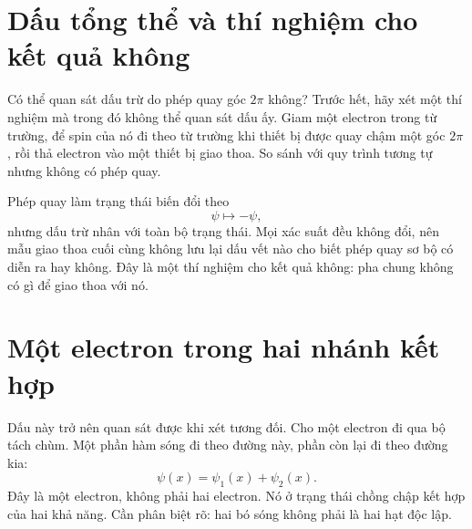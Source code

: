 \begin{classroomqa}
\end{classroomqa}

\section{Dấu tổng thể và thí nghiệm cho kết quả không}

Có thể quan sát dấu trừ do phép quay góc \(2\pi\) không? Trước hết, hãy xét một thí nghiệm mà trong đó không thể quan sát dấu ấy. Giam một electron trong từ trường, để spin của nó đi theo từ trường khi thiết bị được quay chậm một góc \(2\pi\), rồi thả electron vào một thiết bị giao thoa. So sánh với quy trình tương tự nhưng không có phép quay.

Phép quay làm trạng thái biến đổi theo
\begin{equation}
\psi\longmapsto-\psi,
\end{equation}
nhưng dấu trừ nhân với toàn bộ trạng thái. Mọi xác suất đều không đổi, nên mẫu giao thoa cuối cùng không lưu lại dấu vết nào cho biết phép quay sơ bộ có diễn ra hay không. Đây là một thí nghiệm cho kết quả không: pha chung không có gì để giao thoa với nó.

\begin{classroomqa}
\end{classroomqa}

\section{Một electron trong hai nhánh kết hợp}

Dấu này trở nên quan sát được khi xét tương đối. Cho một electron đi qua bộ tách chùm. Một phần hàm sóng đi theo đường này, phần còn lại đi theo đường kia:
\begin{equation}
\psi(x)=\psi_1(x)+\psi_2(x).
\end{equation}
Đây là một electron, không phải hai electron. Nó ở trạng thái chồng chập kết hợp của hai khả năng. Cần phân biệt rõ: hai bó sóng không phải là hai hạt độc lập.

